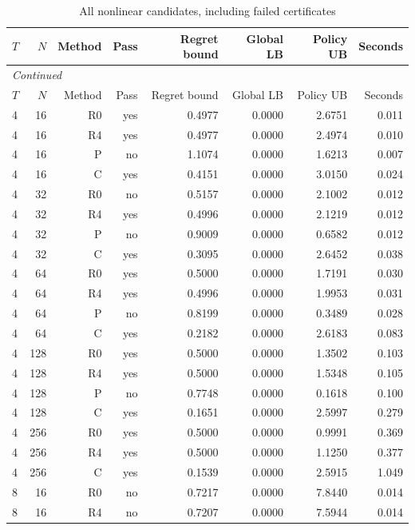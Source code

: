 {\small\setlength{\tabcolsep}{4pt}\begin{longtable}{lrrrrrrr}
\caption{All nonlinear candidates, including failed certificates}\label{tab:all_multistate}\\
\toprule
$T$ & $N$ & Method & Pass & Regret bound & Global LB & Policy UB & Seconds \\
\midrule\endfirsthead
\multicolumn{8}{l}{\emph{Continued}}\\\toprule
$T$ & $N$ & Method & Pass & Regret bound & Global LB & Policy UB & Seconds \\
\midrule\endhead
4 & 16 & R0 & yes & 0.4977 & 0.0000 & 2.6751 & 0.011 \\
4 & 16 & R4 & yes & 0.4977 & 0.0000 & 2.4974 & 0.010 \\
4 & 16 & P & no & 1.1074 & 0.0000 & 1.6213 & 0.007 \\
4 & 16 & C & yes & 0.4151 & 0.0000 & 3.0150 & 0.024 \\
4 & 32 & R0 & no & 0.5157 & 0.0000 & 2.1002 & 0.012 \\
4 & 32 & R4 & yes & 0.4996 & 0.0000 & 2.1219 & 0.012 \\
4 & 32 & P & no & 0.9009 & 0.0000 & 0.6582 & 0.012 \\
4 & 32 & C & yes & 0.3095 & 0.0000 & 2.6452 & 0.038 \\
4 & 64 & R0 & yes & 0.5000 & 0.0000 & 1.7191 & 0.030 \\
4 & 64 & R4 & yes & 0.4996 & 0.0000 & 1.9953 & 0.031 \\
4 & 64 & P & no & 0.8199 & 0.0000 & 0.3489 & 0.028 \\
4 & 64 & C & yes & 0.2182 & 0.0000 & 2.6183 & 0.083 \\
4 & 128 & R0 & yes & 0.5000 & 0.0000 & 1.3502 & 0.103 \\
4 & 128 & R4 & yes & 0.5000 & 0.0000 & 1.5348 & 0.105 \\
4 & 128 & P & no & 0.7748 & 0.0000 & 0.1618 & 0.100 \\
4 & 128 & C & yes & 0.1651 & 0.0000 & 2.5997 & 0.279 \\
4 & 256 & R0 & yes & 0.5000 & 0.0000 & 0.9991 & 0.369 \\
4 & 256 & R4 & yes & 0.5000 & 0.0000 & 1.1250 & 0.377 \\
4 & 256 & C & yes & 0.1539 & 0.0000 & 2.5915 & 1.049 \\
8 & 16 & R0 & no & 0.7217 & 0.0000 & 7.8440 & 0.014 \\
8 & 16 & R4 & no & 0.7207 & 0.0000 & 7.5944 & 0.014 \\

\end{longtable}}
